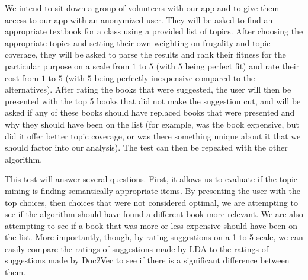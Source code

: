 We intend to sit down a group of volunteers with our app and to give them access to our app with an anonymized user.  
They will be asked to find an appropriate textbook for a class using a provided list of topics.  
After choosing the appropriate topics and setting their own weighting on frugality and topic coverage, they will be asked to parse the results and rank their fitness for the particular purpose on a scale from $1$ to $5$ (with $5$ being perfect fit) and rate their cost from $1$ to $5$ (with $5$ being perfectly inexpensive compared to the alternatives).  
After rating the books that were suggested, the user will then be presented with the top 5 books that did not make the suggestion cut, and will be asked if any of these books should have replaced books that were presented and why they should have been on the list (for example, was the book expensive, but did it offer better topic coverage, or was there something unique about it that we should factor into our analysis).  
The test can then be repeated with the other algorithm.

This test will answer several questions.  
First, it allows us to evaluate if the topic mining is finding semantically appropriate items.  
By presenting the user with the top choices, then choices that were not considered optimal, we are attempting to see if the algorithm should have found a different book more relevant.  
We are also attempting to see if a book that was more or less expensive should have been on the list.  
More importantly, though, by rating suggestions on a 1 to 5 scale, we can easily compare the ratings of suggestions made by LDA to the ratings of suggestions made by Doc2Vec to see if there is a significant difference between them.  




